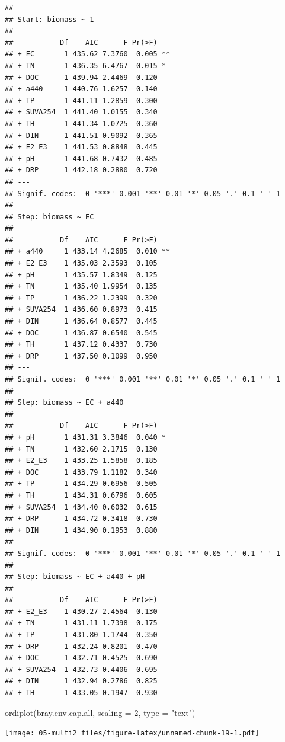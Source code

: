 \documentclass[
]{book}
\newenvironment{Shaded}{\begin{snugshade}}{\end{snugshade}}
\newcommand{\AttributeTok}[1]{\textcolor[rgb]{0.77,0.63,0.00}{#1}}
\newcommand{\DecValTok}[1]{\textcolor[rgb]{0.00,0.00,0.81}{#1}}
\newcommand{\FunctionTok}[1]{\textcolor[rgb]{0.00,0.00,0.00}{#1}}
\newcommand{\NormalTok}[1]{#1}
\newcommand{\StringTok}[1]{\textcolor[rgb]{0.31,0.60,0.02}{#1}}
\begin{document}
\begin{verbatim}
## 
## Start: biomass ~ 1 
## 
##           Df    AIC      F Pr(>F)   
## + EC       1 435.62 7.3760  0.005 **
## + TN       1 436.35 6.4767  0.015 * 
## + DOC      1 439.94 2.4469  0.120   
## + a440     1 440.76 1.6257  0.140   
## + TP       1 441.11 1.2859  0.300   
## + SUVA254  1 441.40 1.0155  0.340   
## + TH       1 441.34 1.0725  0.360   
## + DIN      1 441.51 0.9092  0.365   
## + E2_E3    1 441.53 0.8848  0.445   
## + pH       1 441.68 0.7432  0.485   
## + DRP      1 442.18 0.2880  0.720   
## ---
## Signif. codes:  0 '***' 0.001 '**' 0.01 '*' 0.05 '.' 0.1 ' ' 1
## 
## Step: biomass ~ EC 
## 
##           Df    AIC      F Pr(>F)   
## + a440     1 433.14 4.2685  0.010 **
## + E2_E3    1 435.03 2.3593  0.105   
## + pH       1 435.57 1.8349  0.125   
## + TN       1 435.40 1.9954  0.135   
## + TP       1 436.22 1.2399  0.320   
## + SUVA254  1 436.60 0.8973  0.415   
## + DIN      1 436.64 0.8577  0.445   
## + DOC      1 436.87 0.6540  0.545   
## + TH       1 437.12 0.4337  0.730   
## + DRP      1 437.50 0.1099  0.950   
## ---
## Signif. codes:  0 '***' 0.001 '**' 0.01 '*' 0.05 '.' 0.1 ' ' 1
## 
## Step: biomass ~ EC + a440 
## 
##           Df    AIC      F Pr(>F)  
## + pH       1 431.31 3.3846  0.040 *
## + TN       1 432.60 2.1715  0.130  
## + E2_E3    1 433.25 1.5858  0.185  
## + DOC      1 433.79 1.1182  0.340  
## + TP       1 434.29 0.6956  0.505  
## + TH       1 434.31 0.6796  0.605  
## + SUVA254  1 434.40 0.6032  0.615  
## + DRP      1 434.72 0.3418  0.730  
## + DIN      1 434.90 0.1953  0.880  
## ---
## Signif. codes:  0 '***' 0.001 '**' 0.01 '*' 0.05 '.' 0.1 ' ' 1
## 
## Step: biomass ~ EC + a440 + pH 
## 
##           Df    AIC      F Pr(>F)
## + E2_E3    1 430.27 2.4564  0.130
## + TN       1 431.11 1.7398  0.175
## + TP       1 431.80 1.1744  0.350
## + DRP      1 432.24 0.8201  0.470
## + DOC      1 432.71 0.4525  0.690
## + SUVA254  1 432.73 0.4406  0.695
## + DIN      1 432.94 0.2786  0.825
## + TH       1 433.05 0.1947  0.930
\end{verbatim}

\begin{Shaded}
\begin{Highlighting}[]
\FunctionTok{ordiplot}\NormalTok{(bray.env.cap.all, }\AttributeTok{scaling =} \DecValTok{2}\NormalTok{, }\AttributeTok{type =} \StringTok{"text"}\NormalTok{)}
\end{Highlighting}
\end{Shaded}

\texttt{[image: 05-multi2\_files/figure-latex/unnamed-chunk-19-1.pdf]}
\end{document}
